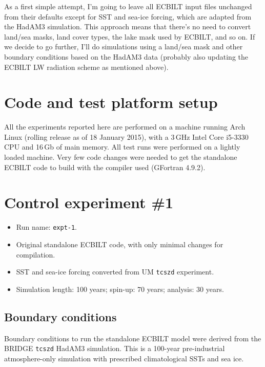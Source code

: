 \documentclass[a4paper,11pt,article]{article}
\begin{document}
As a first simple attempt, I'm going to leave all ECBILT input files
unchanged from their defaults except for SST and sea-ice forcing,
which are adapted from the HadAM3 simulation.  This approach means
that there's no need to convert land/sea masks, land cover types, the
lake mask used by ECBILT, and so on.  If we decide to go further, I'll
do simulations using a land/sea mask and other boundary conditions
based on the HadAM3 data (probably also updating the ECBILT LW
radiation scheme as mentioned above).


\section{Code and test platform setup}

All the experiments reported here are performed on a machine running
Arch Linux (rolling release as of 18 January 2015), with a 3\,GHz
Intel Core i5-3330 CPU and 16\,Gb of main memory.  All test runs were
performed on a lightly loaded machine.  Very few code changes were
needed to get the standalone ECBILT code to build with the compiler
used (GFortran 4.9.2).


\section{Control experiment \#1}

\begin{itemize}
  \item{Run name: \texttt{expt-1}.}
  \item{Original standalone ECBILT code, with only minimal changes for
    compilation.}
  \item{SST and sea-ice forcing converted from UM \texttt{tcszd}
    experiment.}
  \item{Simulation length: 100 years; spin-up: 70 years; analysis: 30
    years.}
\end{itemize}

\subsection{Boundary conditions}

Boundary conditions to run the standalone ECBILT model were derived
from the BRIDGE \texttt{tcszd} HadAM3 simulation.  This is a 100-year
pre-industrial atmosphere-only simulation with prescribed
climatological SSTs and sea ice.
\end{document}
